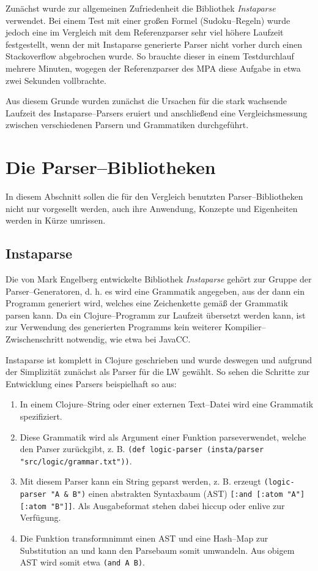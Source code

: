 \documentclass[ngerman,a4paper,abstracton,open=right,twoside=false,toc=listofnumbered,bibtotocnumbered]{scrreprt}
\begin{document}
Zunächst wurde zur allgemeinen Zufriedenheit die Bibliothek \emph{Instaparse} verwendet. Bei einem Test mit einer großen Formel (Sudoku--Regeln) wurde jedoch eine im Vergleich mit dem Referenzparser sehr viel höhere Laufzeit festgestellt, wenn der mit Instaparse generierte Parser nicht vorher durch einen Stackoverflow abgebrochen wurde. So brauchte dieser in einem Testdurchlauf mehrere Minuten, wogegen der Referenzparser des MPA diese Aufgabe in etwa zwei Sekunden vollbrachte.

Aus diesem Grunde wurden zunächst die Ursachen für die stark wachsende Laufzeit des Instaparse--Parsers eruiert und anschließend eine Vergleichsmessung zwischen verschiedenen Parsern und Grammatiken durchgeführt.

\section{Die Parser--Bibliotheken}

In diesem Abschnitt sollen die für den Vergleich benutzten Parser--Bibliotheken nicht nur vorgesellt werden, auch ihre Anwendung, Konzepte und Eigenheiten werden in Kürze umrissen.

\subsection{Instaparse}

Die von Mark Engelberg entwickelte Bibliothek \emph{Instaparse} gehört zur Gruppe der Parser--Generatoren, d. h. es wird eine Grammatik angegeben, aus der dann ein Programm generiert wird, welches eine Zeichenkette gemäß der Grammatik parsen kann. Da ein Clojure--Programm zur Laufzeit übersetzt werden kann, ist zur Verwendung des generierten Programms kein weiterer Kompilier--Zwischenschritt notwendig, wie etwa bei JavaCC. \cite{instaparse}

Instaparse ist komplett in Clojure geschrieben und wurde deswegen und aufgrund der Simplizität zunächst als Parser für die LW gewählt. So sehen die Schritte zur Entwicklung eines Parsers beispielhaft so aus:

\begin{enumerate}
	\item In einem Clojure--String oder einer externen Text--Datei wird eine Grammatik spezifiziert.
	\item Diese Grammatik wird als Argument einer Funktion \glqq parse\grqq verwendet, welche den Parser zurückgibt, z. B. \lstinline|(def logic-parser (insta/parser "src/logic/grammar.txt"))|.
	\item Mit diesem Parser kann ein String geparst werden, z. B. erzeugt \lstinline|(logic-parser "A & B")| einen abstrakten Syntaxbaum (AST) \lstinline|[:and [:atom "A"] [:atom "B"]]|. Als Ausgabeformat stehen dabei hiccup oder enlive zur Verfügung.
	\item Die Funktion \glqq transform\grqq nimmt einen AST und eine Hash--Map zur Substitution an und kann den Parsebaum somit umwandeln. Aus obigem AST wird somit etwa \lstinline|(and A B)|.
\end{enumerate}
\end{document}
